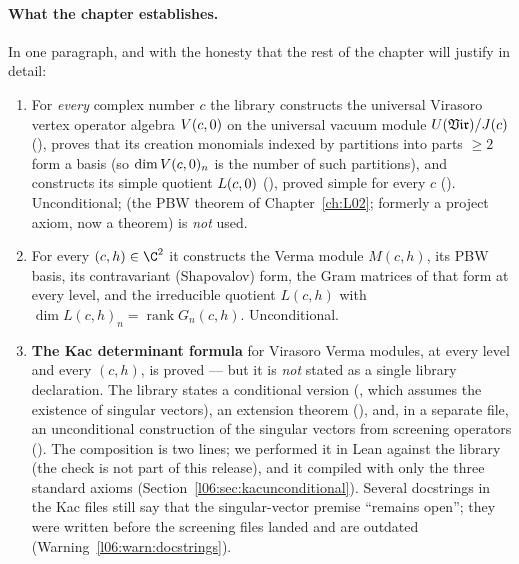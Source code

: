 \paragraph{What the chapter establishes.} In one paragraph, and with the honesty that the rest of the
chapter will justify in detail:
\begin{enumerate}
\item For \emph{every} complex number $c$ the library constructs the universal Virasoro vertex
  operator algebra $V(c,0)$ on the universal vacuum module $U(\mathfrak{Vir})/J(c)$
  (), proves that its creation monomials indexed by partitions into
  parts $\ge2$ form a basis (so $\dim V(c,0)_n$ is the number of such partitions), and constructs its
  simple quotient $L(c,0)$ (\allowbreak{}), proved simple for every $c$
  (\allowbreak{}\allowbreak{}). Unconditional;  (the PBW theorem of Chapter~\ref{ch:L02}; formerly a project axiom, now a theorem) is
  \emph{not} used.
\item For every $(c,h)\in\C^2$ it constructs the Verma module $M(c,h)$, its PBW basis, its
  contravariant (Shapovalov) form, the Gram matrices of that form at every level, and the irreducible
  quotient $L(c,h)$ with $\dim L(c,h)_n = \operatorname{rank}G_n(c,h)$. Unconditional.
\item \textbf{The Kac determinant formula} for Virasoro Verma modules, at every level and every
  $(c,h)$, is proved --- but it is \emph{not} stated as a single library declaration. The library
  states a conditional version (\allowbreak{}\allowbreak{}\allowbreak{}\allowbreak{}, which assumes the
  existence of singular vectors), an extension theorem (\allowbreak{}\allowbreak{}\allowbreak{}\allowbreak{}\allowbreak{}), and,
  in a separate file, an unconditional construction of the singular vectors from screening operators
  (\allowbreak{}\allowbreak{}\allowbreak{}). The composition is two lines; we performed it in Lean against the
  library (the check is not part of this release), and it
  compiled with only the three standard axioms (Section~\ref{l06:sec:kacunconditional}). Several
  docstrings in the Kac files still say that the singular-vector premise ``remains open''; they were
  written before the screening files landed and are outdated (Warning~\ref{l06:warn:docstrings}).

\end{enumerate}
